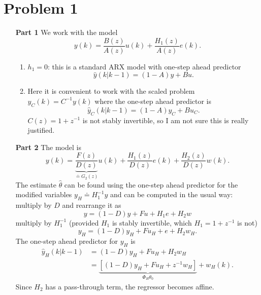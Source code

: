 \documentclass[11pt]{article}
\begin{document}
\section*{Problem 1}
\label{sec:prob1}

\begin{enumerate}
\item [\textbf{Part 1}]
  We work with the model
  \begin{equation*}
    y(k) = \frac{B(z)}{A(z)}u(k) + \frac{H_1(z)}{A(z)}e(k).
  \end{equation*}
  \begin{enumerate}%
  \item $h_1= 0$: this is a standard ARX model with one-step ahead predictor
    \begin{equation*}
      \hat{y}(k|k-1) = (1-A)y+Bu.
    \end{equation*}
  \item Here it is convenient to work with the scaled problem $y_C(k) = C^{-1}y(k)$ where the one-step ahead predictor is
    \begin{equation*}
      \hat{y}_C(k|k-1) = (1-A)y_C+Bu_C.
    \end{equation*}
    $C(z) = 1+z^{-1}$ is not stably invertible, so I am not sure this is really justified.

  \end{enumerate}

\item [\textbf{Part 2}] The model is
\begin{equation}
  \label{eq:prob1-eq3}
  y(k) = \underbrace{\frac{F(z)}{D(z)}}_{\doteq G_2(z)}u(k) + \frac{H_1(z)}{D(z)}e(k) + \frac{H_2(z)}{D(z)}w(k).
\end{equation}
The estimate $\hat{\theta}$ can be found using the one-step ahead predictor for the modified variables $y_H\doteq H_1^{-1}y$ and can be computed in the usual way: multiply by $D$ and rearrange it as
\begin{equation}
  \label{eq:prob1-eq3-linear}
  y = (1-D)y + Fu + H_1e + H_2w
\end{equation}
multiply by $H_1^{-1}$ (provided $H_1$ is stably invertible, which $H_1=1+z^{-1}$ is not)
\begin{equation*}
  y_H = (1-D)y_H + Fu_H + e + H_2w_H.
\end{equation*}
The one-step ahead predictor for $y_H$ is
\begin{align*}
  \hat{y}_H(k|k-1) &= (1-D)y_H + Fu_H + H_2w_H \\
                   &= \underbrace{\left[(1-D)y_H + Fu_H + z^{-1}w_H\right]}_{\Phi_H\theta_0} + w_H(k).
\end{align*}
Since $H_2$ has a pass-through term, the regressor becomes affine.


\end{enumerate}
\end{document}

